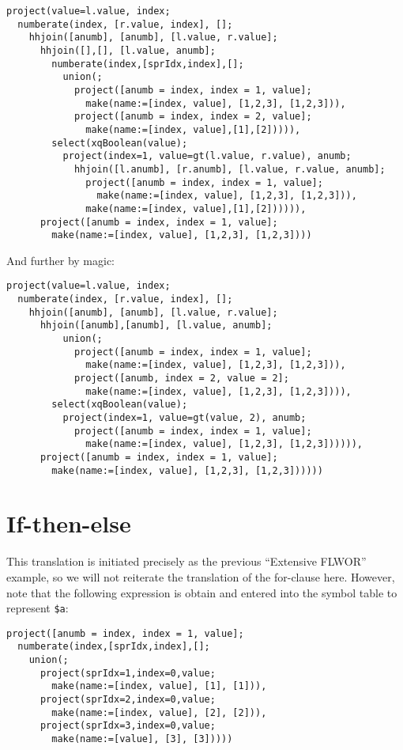 \begin{Verbatim}
project(value=l.value, index;
  numberate(index, [r.value, index], [];
    hhjoin([anumb], [anumb], [l.value, r.value];
      hhjoin([],[], [l.value, anumb];
        numberate(index,[sprIdx,index],[];
          union(;
            project([anumb = index, index = 1, value];
              make(name:=[index, value], [1,2,3], [1,2,3])),
            project([anumb = index, index = 2, value];
              make(name:=[index, value],[1],[2])))),
        select(xqBoolean(value);
          project(index=1, value=gt(l.value, r.value), anumb;
            hhjoin([l.anumb], [r.anumb], [l.value, r.value, anumb];
              project([anumb = index, index = 1, value];
                make(name:=[index, value], [1,2,3], [1,2,3])),
              make(name:=[index, value],[1],[2]))))),
      project([anumb = index, index = 1, value];
        make(name:=[index, value], [1,2,3], [1,2,3])))
\end{Verbatim}

And further by magic:

\begin{Verbatim}
project(value=l.value, index;
  numberate(index, [r.value, index], [];
    hhjoin([anumb], [anumb], [l.value, r.value];
      hhjoin([anumb],[anumb], [l.value, anumb];
          union(;
            project([anumb = index, index = 1, value];
              make(name:=[index, value], [1,2,3], [1,2,3])),
            project([anumb, index = 2, value = 2];
              make(name:=[index, value], [1,2,3], [1,2,3]))),
        select(xqBoolean(value);
          project(index=1, value=gt(value, 2), anumb;
            project([anumb = index, index = 1, value];
              make(name:=[index, value], [1,2,3], [1,2,3]))))),
      project([anumb = index, index = 1, value];
        make(name:=[index, value], [1,2,3], [1,2,3])))))
\end{Verbatim}


\section{If-then-else}
\label{appendix:transl:ifthenelse}
This translation is initiated precisely as the previous ``Extensive FLWOR''
example, so we will not reiterate the translation of the for-clause here.
However, note that the following expression is obtain and entered into the
symbol table to represent \texttt{\$a}:

\begin{Verbatim}
project([anumb = index, index = 1, value];
  numberate(index,[sprIdx,index],[];
    union(;
      project(sprIdx=1,index=0,value;
        make(name:=[index, value], [1], [1])),
      project(sprIdx=2,index=0,value;
        make(name:=[index, value], [2], [2])),
      project(sprIdx=3,index=0,value;
        make(name:=[value], [3], [3]))))
\end{Verbatim}

